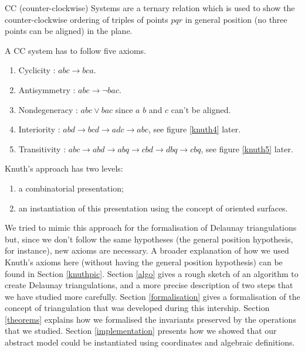 \documentclass[a4paper,10pt]{article}
\begin{document}
CC (counter-clockwise) Systems are a ternary relation which is used to show the counter-clockwise ordering of triples of points $pqr$ in general position (no three points can be aligned) in the plane.

A CC system has to follow five axioms.
\begin{enumerate}
\item Cyclicity : $abc \rightarrow bca$.
\item Antisymmetry : $abc\rightarrow \neg bac$.
\item Nondegeneracy : $abc \vee bac$ since $a$ $b$ and $c$ can't be aligned.
\item Interiority : $abd \rightarrow bcd \rightarrow adc \rightarrow abc$, see figure \ref{knuth4} later.
\item Transitivity : $ abc \rightarrow abd \rightarrow abq \rightarrow cbd \rightarrow dbq \rightarrow cbq $, see figure \ref{knuth5} later.
\end{enumerate}

Knuth's approach has two levels:
\begin{enumerate}
\item a combinatorial presentation;
\item an instantiation of this presentation using the concept of oriented surfaces.
\end{enumerate}

We tried to mimic this approach for the formalisation of Delaunay triangulations but, since we don't follow the same hypotheses (the general position hypothesis, for instance), new axioms are necessary.
A broader explanation of how we used Knuth's axioms here (without having the general position hypothesis) can be found in Section \ref{knuthpic}.
\vspace{0.7 cm}
Section \ref{algo} gives a rough sketch of an algorithm to create Delaunay triangulations, and a more precise description of two steps that we have studied more carefully.  Section \ref{formalisation} gives a formalisation of the concept of triangulation that was developed during this intership.  Section \ref{theorems} explains how we formalised the invariants preserved by the operations that we studied.  Section \ref{implementation} presents how we showed that our abstract model could be instantiated using coordinates and algebraic definitions.
\end{document}
